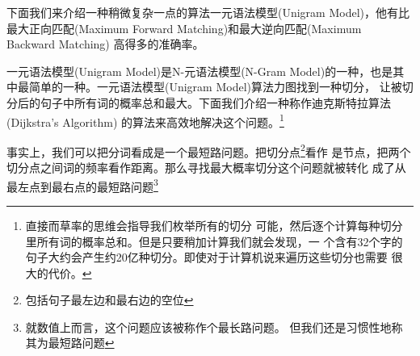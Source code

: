 \documentclass[12pt,a4paper]{article}
\def\maxforward{最大正向匹配(Maximum Forward Matching)}
\def\maxbackward{最大逆向匹配(Maximum Backward Matching)}
\def\NGram{N-元语法模型(N-Gram Model)}
\def\UniGram{一元语法模型(Unigram Model)}
\def\DijkstraAlgorithm{迪克斯特拉算法(Dijkstra's Algorithm)}
\begin{document}
下面我们来介绍一种稍微复杂一点的算法\UniGram，他有比\maxforward 和\maxbackward
高得多的准确率。

\UniGram 是\NGram 的一种，也是其中最简单的一种。\UniGram 算法力图找到一种切分，
让被切分后的句子中所有词的概率总和最大。下面我们介绍一种称作\DijkstraAlgorithm
的算法来高效地解决这个问题。\footnote{直接而草率的思维会指导我们枚举所有的切分
可能，然后逐个计算每种切分里所有词的概率总和。但是只要稍加计算我们就会发现，一
个含有32个字的句子大约会产生约20亿种切分。即使对于计算机说来遍历这些切分也需要
很大的代价。}

事实上，我们可以把分词看成是一个最短路问题。把切分点\footnote{包括句子最左边和最右边的空位}看作
是节点，把两个切分点之间词的频率看作距离。那么寻找最大概率切分这个问题就被转化
成了从最左点到最右点的最短路问题\footnote{就数值上而言，这个问题应该被称作个最长路问题。
但我们还是习惯性地称其为最短路问题} 


\begin{algorithm}
	\label{alg_maxforward}
	\dontprintsemicolon
	\linesnumbered

	\caption{\maxforward}
\end{algorithm}
\end{document}
